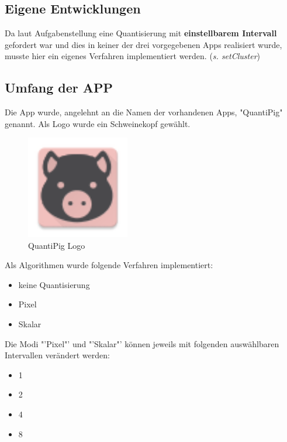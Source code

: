 \begin{description}
\subsection{Eigene Entwicklungen}

Da laut Aufgabenstellung eine Quantisierung mit \textbf{einstellbarem Intervall} gefordert war und dies in keiner der drei vorgegebenen Apps realisiert wurde, musste hier ein eigenes Verfahren implementiert werden. (\textit{s. setCluster})\\



\subsection{Umfang der APP}
Die App wurde, angelehnt an die Namen der vorhandenen Apps, "QuantiPig" genannt. Als Logo wurde ein Schweinekopf gewählt.
\begin{figure}[h]
	\centering
		\includegraphics[width=0.4\textwidth]{img/ic_launcher.png}
	\caption[QuantiPig Logo]{QuantiPig Logo}
	\label{fig:pig_logo}
\end{figure}

Als Algorithmen wurde folgende Verfahren implementiert:

\begin{itemize}
	\item keine Quantisierung
	\item Pixel  
	\item Skalar
\end{itemize}

Die Modi "'Pixel"' und "'Skalar"' können jeweils mit folgenden auswählbaren Intervallen verändert werden:
\begin{itemize}
	\item 1
	\item 2
	\item 4
	\item 8
\end{itemize}



\end{description}
